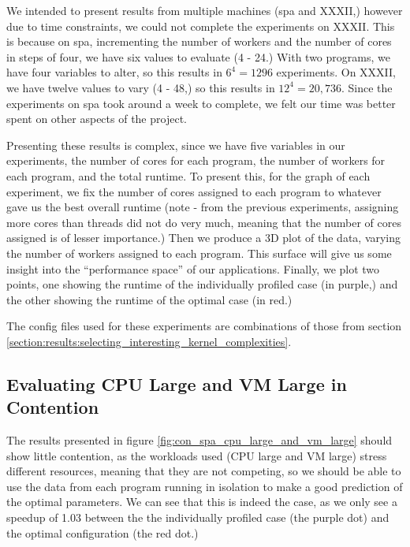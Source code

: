 We intended to present results from multiple machines (spa and XXXII,) however due to time constraints, we could not complete the experiments on XXXII. This is because on spa, incrementing the number of workers and the number of cores in steps of four, we have six values to evaluate (4 - 24.) With two programs, we have four variables to alter, so this results in $6^4 = 1296$ experiments. On XXXII, we have twelve values to vary (4 - 48,) so this results in $12^4 = 20,736$. Since the experiments on spa took around a week to complete, we felt our time was better spent on other aspects of the project.

Presenting these results is complex, since we have five variables in our experiments, the number of cores for each program, the number of workers for each program, and the total runtime. To present this, for the graph of each experiment, we fix the number of cores assigned to each program to whatever gave us the best overall runtime (note - from the previous experiments, assigning more cores than threads did not do very much, meaning that the number of cores assigned is of lesser importance.) Then we produce a 3D plot of the data, varying the number of workers assigned to each program. This surface will give us some insight into the ``performance space'' of our applications. Finally, we plot two points, one showing the runtime of the individually profiled case (in purple,) and the other showing the runtime of the optimal case (in red.) 

The config files used for these experiments are combinations of those from section \ref{section:results:selecting_interesting_kernel_complexities}.



\subsection{Evaluating CPU Large and VM Large in Contention}
\label{section:results:evaluating_cpu_large_and_vm_large_in_contention}

The results presented in figure \ref{fig:con_spa_cpu_large_and_vm_large} should show little contention, as the workloads used (CPU large and VM large) stress different resources, meaning that they are not competing, so we should be able to use the data from each program running in isolation to make a good prediction of the optimal parameters. We can see that this is indeed the case, as we only see a speedup of 1.03 between the the individually profiled case (the purple dot) and the optimal configuration (the red dot.)

